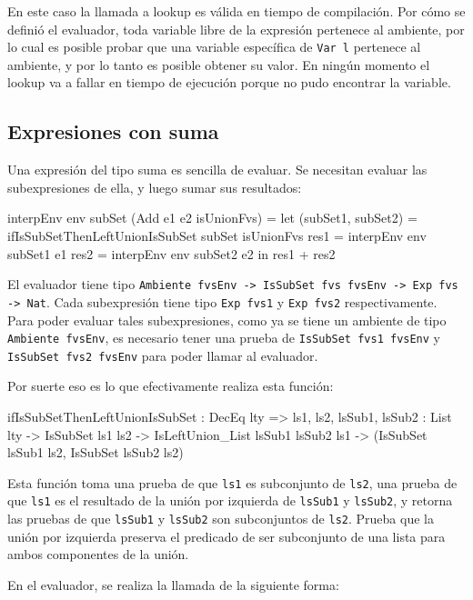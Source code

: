En este caso la llamada a lookup es válida en tiempo de compilación. Por cómo se definió el evaluador, toda variable libre de la expresión pertenece al ambiente, por lo cual es posible probar que una variable específica de \texttt{Var l} pertenece al ambiente, y por lo tanto es posible obtener su valor. En ningún momento el lookup va a fallar en tiempo de ejecución porque no pudo encontrar la variable.

\subsection{Expresiones con suma}

Una expresión del tipo suma es sencilla de evaluar. Se necesitan evaluar las subexpresiones de ella, y luego sumar sus resultados:

\begin{code}
interpEnv env subSet (Add e1 e2 isUnionFvs) =
  let (subSet1, subSet2) =
      ifIsSubSetThenLeftUnionIsSubSet subSet isUnionFvs
    res1 = interpEnv env subSet1 e1
    res2 = interpEnv env subSet2 e2
  in res1 + res2
\end{code}

El evaluador tiene tipo \texttt{Ambiente fvsEnv -> IsSubSet fvs fvsEnv -> Exp fvs -> Nat}. Cada subexpresión tiene tipo \texttt{Exp fvs1} y \texttt{Exp fvs2} respectivamente. Para poder evaluar tales subexpresiones, como ya se tiene un ambiente de tipo \texttt{Ambiente fvsEnv}, es necesario tener una prueba de \texttt{IsSubSet fvs1 fvsEnv} y \texttt{IsSubSet fvs2 fvsEnv} para poder llamar al evaluador.

Por suerte eso es lo que efectivamente realiza esta función:

\begin{code}
ifIsSubSetThenLeftUnionIsSubSet : DecEq lty =>
  {ls1, ls2, lsSub1, lsSub2 : List lty} -> IsSubSet ls1 ls2 ->
  IsLeftUnion_List lsSub1 lsSub2 ls1 ->
  (IsSubSet lsSub1 ls2, IsSubSet lsSub2 ls2)
\end{code}

Esta función toma una prueba de que \texttt{ls1} es subconjunto de \texttt{ls2}, una prueba de que \texttt{ls1} es el resultado de la unión por izquierda de \texttt{lsSub1} y \texttt{lsSub2}, y retorna las pruebas de que \texttt{lsSub1} y \texttt{lsSub2} son subconjuntos de \texttt{ls2}. Prueba que la unión por izquierda preserva el predicado de ser subconjunto de una lista para ambos componentes de la unión.

En el evaluador, se realiza la llamada de la siguiente forma:

